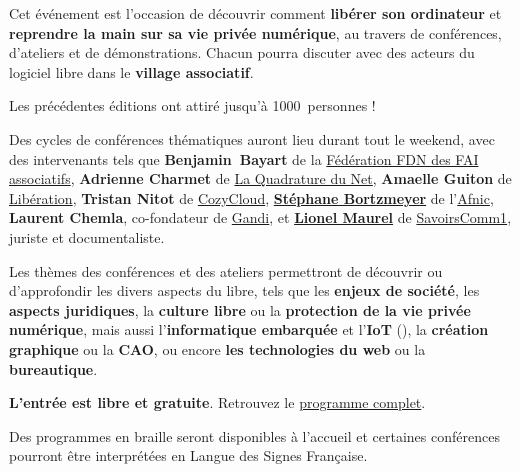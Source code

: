 
\Separateur

Cet événement est l'occasion de découvrir comment \textbf{libérer son ordinateur}
et \textbf{reprendre la main sur sa vie privée numérique},
au travers de conférences, d'ateliers et de démonstrations.
Chacun pourra discuter avec des acteurs du logiciel libre dans le \textbf{village associatif}.

Les précédentes éditions ont attiré jusqu'à \num{1000}~personnes !

\Separateur

Des cycles de conférences thématiques auront lieu durant tout le weekend,
avec des intervenants tels que \textbf{\mbox{Benjamin Bayart}} de la \href{http://ffdn.org/}{Fédération FDN des FAI associatifs},
\textbf{Adrienne Charmet} de \href{http://laquadrature.net/}{La Quadrature du Net},
\textbf{Amaelle Guiton} de \href{http://www.liberation.fr/auteur/15260-amaelle-guiton}{Libération},
\textbf{Tristan Nitot} de \href{https://cozy.io/fr/}{CozyCloud},
\textbf{\href{http://www.bortzmeyer.org/}{Stéphane Bortzmeyer}} de l'\href{http://www.afnic.fr}{Afnic},
\textbf{Laurent Chemla}, co-fondateur de \href{http://gandi.net/}{Gandi},
et \textbf{\href{http://scinfolex.com/}{Lionel Maurel}} de \href{http://savoirscom1.info/}{SavoirsComm1}, juriste et documentaliste.

\Separateur

Les thèmes des conférences et des ateliers permettront de découvrir ou d'approfondir
les divers aspects du libre, tels que les \textbf{enjeux de société}, les \textbf{aspects juridiques},
la \textbf{culture libre} ou la \textbf{protection de la vie privée numérique},
mais aussi l'\textbf{informatique embarquée} et l'\textbf{IoT} (), la \textbf{création graphique} ou la \textbf{CAO},
ou encore \textbf{les technologies du web} ou la \textbf{bureautique}.

\Separateur

\textbf{L'entrée est libre et gratuite}. Retrouvez le \href{https://2015.capitoledulibre.org/programme/}{programme complet}.

\Separateur

Des programmes en braille seront disponibles à l'accueil et certaines conférences pourront être interprétées en Langue des Signes Française.
